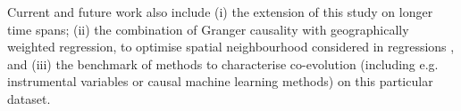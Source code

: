 \documentclass[a4paper]{article}
\begin{document}
Current and future  work also include (i) the extension of this study on longer time spans; (ii) the combination of Granger causality with geographically weighted regression, to optimise spatial neighbourhood considered in regressions \cite{brunsdon1998geographically}, and (iii) the benchmark of methods to characterise co-evolution (including e.g. instrumental variables or causal machine learning methods) on this particular dataset.










\footnotesize



\end{document}
